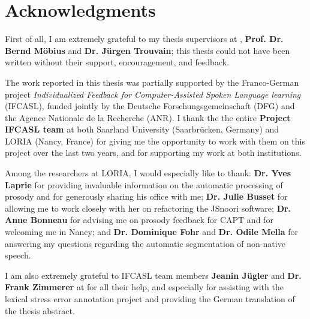 %
\chapter*{Acknowledgments}
\label{sec:thanks}
\vspace*{-10mm}


First of all, I am extremely grateful to my thesis supervisors at {\thesisUniversity}, \textbf{Prof. Dr. Bernd Möbius} and \textbf{Dr. Jürgen Trouvain}; this thesis could not have been written without their support, encouragement, and feedback.

The work reported in this thesis was partially supported by the Franco-German project \textit{Individualized Feedback for Computer-Assisted Spoken Language learning} (IFCASL), funded jointly by the Deutsche Forschungsgemeinschaft (DFG) and the Agence Nationale de la Recherche (ANR). I thank the the entire \textbf{Project IFCASL team} at both Saarland University (Saarbrücken, Germany) and LORIA (Nancy, France) for giving me the opportunity to work with them on this project over the last two years, and for supporting my work at both institutions.

Among the researchers at LORIA, I would especially like to thank:
\textbf{Dr. Yves Laprie} for providing invaluable information on the automatic processing of prosody and for generously sharing his office with me;
\textbf{Dr. Julie Busset} for allowing me to work closely with her on refactoring the JSnoori software; %
\textbf{Dr. Anne Bonneau} for advising me on prosody feedback for CAPT and for welcoming me in Nancy;
and 
\textbf{Dr. Dominique Fohr} and \textbf{Dr. Odile Mella} for answering my questions regarding the automatic segmentation of non-native speech. 

I am also extremely grateful to IFCASL team members \textbf{Jeanin Jügler} and \textbf{Dr. Frank Zimmerer} at {\thesisUniversity} for all their help, and especially for assisting with the lexical stress error annotation project and providing the German translation of the thesis abstract. 


